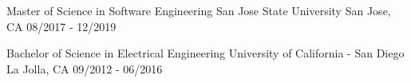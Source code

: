 

\begin{cventries}

  \cventryeducation
    {Master of Science in Software Engineering} %
    {San Jose State University} %
    {San Jose, CA} %
    {08/2017 - 12/2019} %

  \cventryeducation
    {Bachelor of Science in Electrical Engineering} %
    {University of California - San Diego} %
    {La Jolla, CA} %
    {09/2012 - 06/2016} %

   

\end{cventries}
